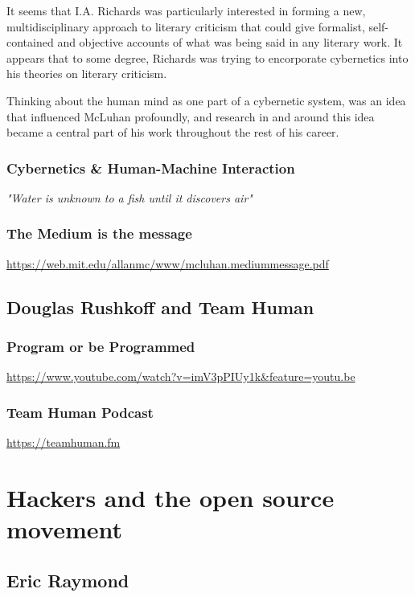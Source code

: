 \documentclass[11pt]{article}
\begin{document}
It seems that I.A. Richards was particularly interested in forming a
new, multidisciplinary approach to literary criticism that could give
formalist, self-contained and objective accounts of what was being
said in any literary work. It appears that to some degree, Richards
was trying to encorporate cybernetics into his theories on literary
criticism.

Thinking about the human mind as one part of a cybernetic system, was
an idea that influenced McLuhan profoundly, and research in and around
this idea became a central part of his work throughout the rest of his
career. 

\subsubsection{Cybernetics \& Human-Machine Interaction}
\label{sec:org7aa6754}
\emph{"Water is unknown to a fish until it discovers air"}

\subsubsection{The Medium is the message}
\label{sec:org4717b0b}
\url{https://web.mit.edu/allanmc/www/mcluhan.mediummessage.pdf}

\subsection{Douglas Rushkoff and Team Human}
\label{sec:orgea6f9d8}
\subsubsection{Program or be Programmed}
\label{sec:orgbf1df62}
\url{https://www.youtube.com/watch?v=imV3pPIUy1k\&feature=youtu.be}

\subsubsection{Team Human Podcast}
\label{sec:orgebc4767}
\url{https://teamhuman.fm}



\section{Hackers and the open source movement}
\label{sec:org49786fe}
\subsection{Eric Raymond}
\label{sec:orgd30eb96}
\end{document}
